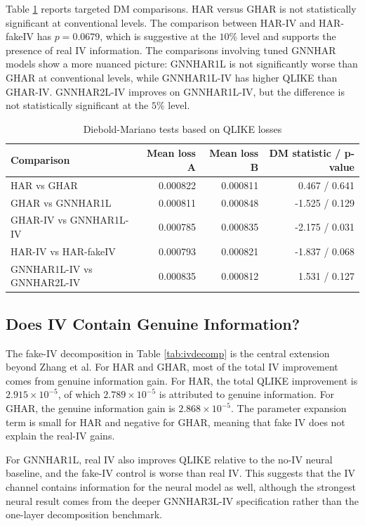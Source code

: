 \documentclass[11pt,a4paper]{article}
\begin{document}
Table \ref{tab:dm} reports targeted DM comparisons. HAR versus GHAR is not statistically
significant at conventional levels. The comparison between HAR-IV and HAR-fakeIV has
\(p=0.0679\), which is suggestive at the \(10\%\) level and supports the presence of real IV
information. The comparisons involving tuned GNNHAR models show a more nuanced picture:
GNNHAR1L is not significantly worse than GHAR at conventional levels, while GNNHAR1L-IV
has higher QLIKE than GHAR-IV. GNNHAR2L-IV improves on GNNHAR1L-IV, but the
difference is not statistically significant at the \(5\%\) level.

\begin{table}[t]
\centering
\caption{Diebold-Mariano tests based on QLIKE losses}
\label{tab:dm}
\begin{tabular}{lrrr}
\toprule
Comparison & Mean loss A & Mean loss B & DM statistic / p-value \\
\midrule
HAR vs GHAR & 0.000822 & 0.000811 & 0.467 / 0.641 \\
GHAR vs GNNHAR1L & 0.000811 & 0.000848 & -1.525 / 0.129 \\
GHAR-IV vs GNNHAR1L-IV & 0.000785 & 0.000835 & -2.175 / 0.031 \\
HAR-IV vs HAR-fakeIV & 0.000793 & 0.000821 & -1.837 / 0.068 \\
GNNHAR1L-IV vs GNNHAR2L-IV & 0.000835 & 0.000812 & 1.531 / 0.127 \\
\bottomrule
\end{tabular}
\end{table}

\subsection{Does IV Contain Genuine Information?}

The fake-IV decomposition in Table \ref{tab:ivdecomp} is the central extension beyond Zhang
et al. For HAR and GHAR, most of the total IV improvement comes from genuine information
gain. For HAR, the total QLIKE improvement is \(2.915\times 10^{-5}\), of which
\(2.789\times 10^{-5}\) is attributed to genuine information. For GHAR, the genuine
information gain is \(2.868\times 10^{-5}\). The parameter expansion term is small for HAR and
negative for GHAR, meaning that fake IV does not explain the real-IV gains.

For GNNHAR1L, real IV also improves QLIKE relative to the no-IV neural baseline, and the
fake-IV control is worse than real IV. This suggests that the IV channel contains information
for the neural model as well, although the strongest neural result comes from the deeper
GNNHAR3L-IV specification rather than the one-layer decomposition benchmark.
\end{document}
